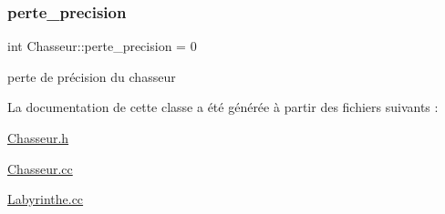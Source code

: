 \subsubsection{\texorpdfstring{perte\+\_\+precision}{perte\_precision}}
{\footnotesize\ttfamily int Chasseur\+::perte\+\_\+precision = 0\hspace{0.3cm}{\ttfamily [private]}}



perte de précision du chasseur 



La documentation de cette classe a été générée à partir des fichiers suivants \+:\begin{DoxyCompactItemize}
\item 
\hyperlink{Chasseur_8h}{Chasseur.\+h}\item 
\hyperlink{Chasseur_8cc}{Chasseur.\+cc}\item 
\hyperlink{Labyrinthe_8cc}{Labyrinthe.\+cc}\end{DoxyCompactItemize}
